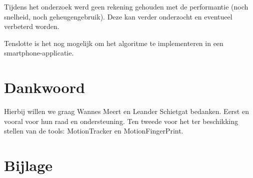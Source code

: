 \documentclass{article}
\begin{document}
Tijdens het onderzoek werd geen rekening gehouden met de performantie (noch snelheid, noch geheugengebruik). Deze kan verder onderzocht en eventueel verbeterd worden.

	


Tenslotte is het nog mogelijk om het algoritme te implementeren in een smartphone-applicatie.

\section{Dankwoord}

Hierbij willen we graag Wannes Meert en Leander Schietgat bedanken. Eerst en vooral voor hun raad en ondersteuning. Ten tweede voor het ter beschikking stellen van de tools: MotionTracker en MotionFingerPrint.





\newpage
\onecolumn

\section{Bijlage}
\end{document}
